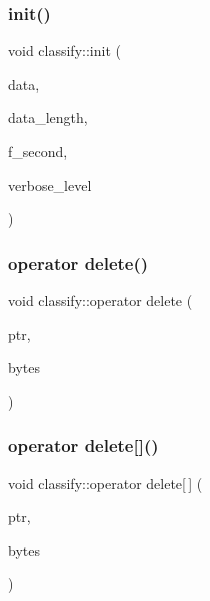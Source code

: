 \subsubsection{\texorpdfstring{init()}{init()}}
{\footnotesize\ttfamily void classify\+::init (\begin{DoxyParamCaption}\item[{\mbox{\hyperlink{galois_8h_a09fddde158a3a20bd2dcadb609de11dc}{I\+NT}} $\ast$}]{data,  }\item[{\mbox{\hyperlink{galois_8h_a09fddde158a3a20bd2dcadb609de11dc}{I\+NT}}}]{data\+\_\+length,  }\item[{\mbox{\hyperlink{galois_8h_a09fddde158a3a20bd2dcadb609de11dc}{I\+NT}}}]{f\+\_\+second,  }\item[{\mbox{\hyperlink{galois_8h_a09fddde158a3a20bd2dcadb609de11dc}{I\+NT}}}]{verbose\+\_\+level }\end{DoxyParamCaption})}

\mbox{\label{classclassify_aca1973594095f37cdb8e48f9d4f2d81f}} 
\subsubsection{\texorpdfstring{operator delete()}{operator delete()}}
{\footnotesize\ttfamily void classify\+::operator delete (\begin{DoxyParamCaption}\item[{void $\ast$}]{ptr,  }\item[{size\+\_\+t}]{bytes }\end{DoxyParamCaption})}

\mbox{\label{classclassify_a2b06726b89c7e487e35614a771cabe71}} 
\subsubsection{\texorpdfstring{operator delete[]()}{operator delete[]()}}
{\footnotesize\ttfamily void classify\+::operator delete\mbox{[}$\,$\mbox{]} (\begin{DoxyParamCaption}\item[{void $\ast$}]{ptr,  }\item[{size\+\_\+t}]{bytes }\end{DoxyParamCaption})}

